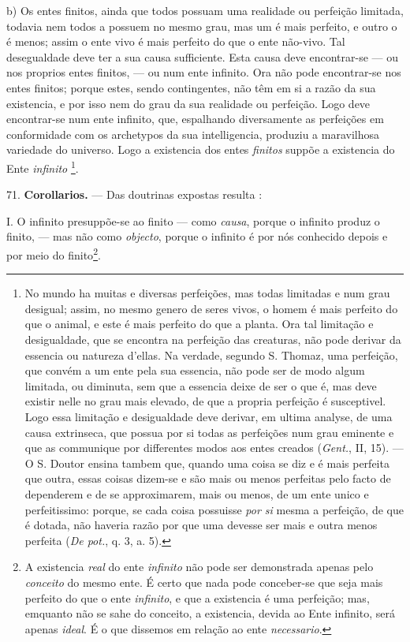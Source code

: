 b) Os entes finitos, ainda que todos possuam uma realidade ou perfeição limitada, todavia nem todos a possuem no mesmo grau, mas um é mais perfeito, e outro o é menos; assim o ente vivo é mais perfeito do que o ente não-vivo. Tal desegualdade deve ter a sua causa sufficiente. Esta causa deve encontrar-se --- ou nos proprios entes finitos, --- ou num ente infinito. Ora não pode encontrar-se nos entes finitos; porque estes, sendo contingentes, não têm em si a razão da sua existencia, e por isso nem do grau da sua realidade ou perfeição. Logo deve encontrar-se num ente infinito, que, espalhando diversamente as perfeições em conformidade com os archetypos da sua intelligencia, produziu a maravilhosa variedade do universo. Logo a existencia dos entes \emph{finitos} suppõe a existencia do Ente \emph{infinito} \footnote{No mundo ha muitas e diversas perfeições, mas todas limitadas e num grau desigual; assim, no mesmo genero de seres vivos, o homem é mais perfeito do que o animal, e este é mais perfeito do que a planta. Ora tal limitação e desigualdade, que se encontra na perfeição das creaturas, não pode derivar da essencia ou natureza d'ellas. Na verdade, segundo S. Thomaz, uma perfeição, que convém a um ente pela sua essencia, não pode ser de modo algum limitada, ou diminuta, sem que a essencia deixe de ser o que é, mas deve existir nelle no grau mais elevado, de que a propria perfeição é susceptivel. Logo essa limitação e desigualdade deve derivar, em ultima analyse, de uma causa extrinseca, que possua por si todas as perfeições num grau eminente e que as communique por differentes modos aos entes creados (\emph{Gent.}, II, 15). --- O S. Doutor ensina tambem que, quando uma coisa se diz e é mais perfeita que outra, essas coisas dizem-se e são mais ou menos perfeitas pelo facto de dependerem e de se approximarem, mais ou menos, de um ente unico e perfeitissimo: porque, se cada coisa possuisse \emph{por si} mesma a perfeição, de que é dotada, não haveria razão por que uma devesse ser mais e outra menos perfeita (\emph{De pot.}, q. 3, a. 5).}.

71. \textbf{Corollarios.} --- Das doutrinas expostas resulta :

I. O infinito presuppõe-se ao finito --- como \emph{causa}, porque o infinito produz o finito, --- mas não como \emph{objecto}, porque o infinito é por nós conhecido depois e por meio do finito\footnote{A existencia \emph{real} do ente \emph{infinito} não pode ser demonstrada apenas pelo \emph{conceito} do mesmo ente. É certo que nada pode conceber-se que seja mais perfeito do que o ente \emph{infinito}, e que a existencia é uma perfeição; mas, emquanto não se sahe do conceito, a existencia, devida ao Ente infinito, será apenas \emph{ideal}. É o que dissemos em relação ao ente \emph{necessario}.}.
